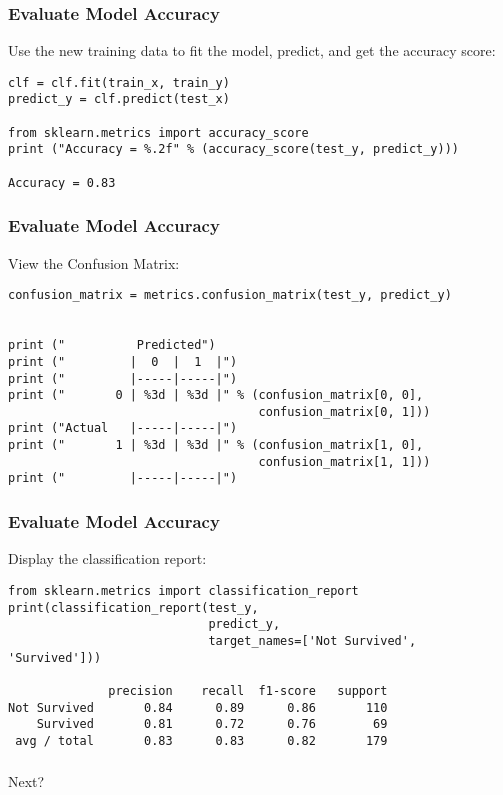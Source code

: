 \begin{frame}[fragile]\frametitle{Evaluate Model Accuracy}
Use the new training data to fit the model, predict, and get the accuracy score:
\begin{lstlisting}
clf = clf.fit(train_x, train_y)
predict_y = clf.predict(test_x)

from sklearn.metrics import accuracy_score
print ("Accuracy = %.2f" % (accuracy_score(test_y, predict_y)))

Accuracy = 0.83
\end{lstlisting}
\end{frame}


\begin{frame}[fragile]\frametitle{Evaluate Model Accuracy}
View the Confusion Matrix:
\begin{lstlisting}
confusion_matrix = metrics.confusion_matrix(test_y, predict_y)


print ("          Predicted")
print ("         |  0  |  1  |")
print ("         |-----|-----|")
print ("       0 | %3d | %3d |" % (confusion_matrix[0, 0],
                                   confusion_matrix[0, 1]))
print ("Actual   |-----|-----|")
print ("       1 | %3d | %3d |" % (confusion_matrix[1, 0],
                                   confusion_matrix[1, 1]))
print ("         |-----|-----|")
\end{lstlisting}
\end{frame}


\begin{frame}[fragile]\frametitle{Evaluate Model Accuracy}
Display the classification report:
\begin{lstlisting}
from sklearn.metrics import classification_report
print(classification_report(test_y, 
                            predict_y, 
                            target_names=['Not Survived', 'Survived']))

              precision    recall  f1-score   support
Not Survived       0.84      0.89      0.86       110
    Survived       0.81      0.72      0.76        69
 avg / total       0.83      0.83      0.82       179                       
\end{lstlisting}
\end{frame}

\begin{frame}[fragile]\frametitle{}
\begin{center}
{\Large Next?}
\end{center}
\end{frame}

